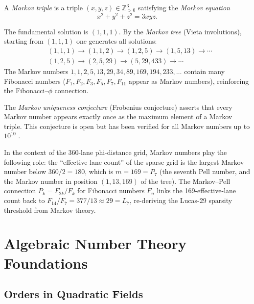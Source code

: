 \begin{definition}\label{def:markov-triple}
A \emph{Markov triple} is a triple
$(x, y, z) \in \mathbb{Z}_{>0}^3$ satisfying
the \emph{Markov equation}
\begin{equation}\label{eq:markov-eq}
  x^2 + y^2 + z^2 = 3xyz.
\end{equation}
\end{definition}

The fundamental solution is $(1,1,1)$.  By the
\emph{Markov tree} (Vieta involutions), starting
from $(1,1,1)$ one generates all solutions:
\begin{align*}
  &(1,1,1) \to (1,1,2) \to (1,2,5) \to (1,5,13) \to \cdots \\
  &(1,2,5) \to (2,5,29) \to (5,29,433) \to \cdots
\end{align*}
The Markov numbers $1, 1, 2, 5, 13, 29, 34, 89,
169, 194, 233, \ldots$ contain many Fibonacci
numbers ($F_1, F_2, F_3, F_5, F_7, F_{11}$
appear as Markov numbers), reinforcing the
Fibonacci--$\phi$ connection.

The \emph{Markov uniqueness conjecture} (Frobenius
conjecture) asserts that every Markov number
appears exactly once as the maximum element of a
Markov triple.  This conjecture is open but has
been verified for all Markov numbers up to
$10^{10}$ \cite{cassels_diophantine}.

In the context of the 360-lane phi-distance grid,
Markov numbers play the following role: the
``effective lane count'' of the sparse grid is
the largest Markov number below $360/2 = 180$,
which is $m = 169 = P_7$ (the seventh Pell number,
and the Markov number in position $(1, 13, 169)$
of the tree).  The Markov--Pell connection
$P_k = F_{2k}/F_k$ for Fibonacci numbers $F_n$
links the 169-effective-lane count back to
$F_{14}/F_7 = 377/13 \approx 29 = L_7$,
re-deriving the Lucas-29 sparsity threshold from
Markov theory.

\section{Algebraic Number Theory Foundations}
\label{sec:algebraic-nt}

\subsection{Orders in Quadratic Fields}
\label{subsec:quadratic-orders}

